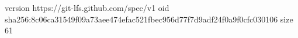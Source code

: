 version https://git-lfs.github.com/spec/v1
oid sha256:8c06ca31549f09a73aee474efac521fbec956d77f7d9adf24f0a9f0cfc030106
size 61
